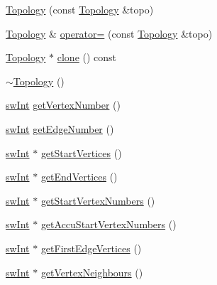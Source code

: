 \begin{DoxyCompactItemize}
\mbox{\hyperlink{classUNAT_1_1Topology_ae1c53ba557ce7d0c587dd46d1eb2b018}{Topology}} (const \mbox{\hyperlink{classUNAT_1_1Topology}{Topology}} \&topo)
\item 
\mbox{\hyperlink{classUNAT_1_1Topology}{Topology}} \& \mbox{\hyperlink{classUNAT_1_1Topology_a75f1187f0c29f844efb53a30e5ddf737}{operator=}} (const \mbox{\hyperlink{classUNAT_1_1Topology}{Topology}} \&topo)
\item 
\mbox{\hyperlink{classUNAT_1_1Topology}{Topology}} $\ast$ \mbox{\hyperlink{classUNAT_1_1Topology_acb0a82ccbd9db10c8e9ddfc73017587a}{clone}} () const
\item 
\mbox{\hyperlink{classUNAT_1_1Topology_a136b0445c89509d4d087a958b58e0d62}{$\sim$\+Topology}} ()
\item 
\mbox{\hyperlink{include_2swMacro_8h_a113cf5f6b5377cdf3fac6aa4e443e9aa}{sw\+Int}} \mbox{\hyperlink{classUNAT_1_1Topology_a7d1d4d508b6e0a44fb0b5f6e6f26a8a5}{get\+Vertex\+Number}} ()
\item 
\mbox{\hyperlink{include_2swMacro_8h_a113cf5f6b5377cdf3fac6aa4e443e9aa}{sw\+Int}} \mbox{\hyperlink{classUNAT_1_1Topology_ace06d8f272b20bdf46d3327f9e0fddf2}{get\+Edge\+Number}} ()
\item 
\mbox{\hyperlink{include_2swMacro_8h_a113cf5f6b5377cdf3fac6aa4e443e9aa}{sw\+Int}} $\ast$ \mbox{\hyperlink{classUNAT_1_1Topology_aa1de517c63444c3fd56d97fc99df2294}{get\+Start\+Vertices}} ()
\item 
\mbox{\hyperlink{include_2swMacro_8h_a113cf5f6b5377cdf3fac6aa4e443e9aa}{sw\+Int}} $\ast$ \mbox{\hyperlink{classUNAT_1_1Topology_a656c287d7a5971a6176c6f379825f3db}{get\+End\+Vertices}} ()
\item 
\mbox{\hyperlink{include_2swMacro_8h_a113cf5f6b5377cdf3fac6aa4e443e9aa}{sw\+Int}} $\ast$ \mbox{\hyperlink{classUNAT_1_1Topology_aef52b7de5eb5124aaa4fa05ddbd6e736}{get\+Start\+Vertex\+Numbers}} ()
\item 
\mbox{\hyperlink{include_2swMacro_8h_a113cf5f6b5377cdf3fac6aa4e443e9aa}{sw\+Int}} $\ast$ \mbox{\hyperlink{classUNAT_1_1Topology_a4d4414052edb9c3fff86ecded9f23a86}{get\+Accu\+Start\+Vertex\+Numbers}} ()
\item 
\mbox{\hyperlink{include_2swMacro_8h_a113cf5f6b5377cdf3fac6aa4e443e9aa}{sw\+Int}} $\ast$ \mbox{\hyperlink{classUNAT_1_1Topology_a3df6e0098b30c960b01989b7e8044431}{get\+First\+Edge\+Vertices}} ()
\item 
\mbox{\hyperlink{include_2swMacro_8h_a113cf5f6b5377cdf3fac6aa4e443e9aa}{sw\+Int}} $\ast$ \mbox{\hyperlink{classUNAT_1_1Topology_af12c10ecd41c8458daf3d8d621f8e42f}{get\+Vertex\+Neighbours}} ()

\end{DoxyCompactItemize}
